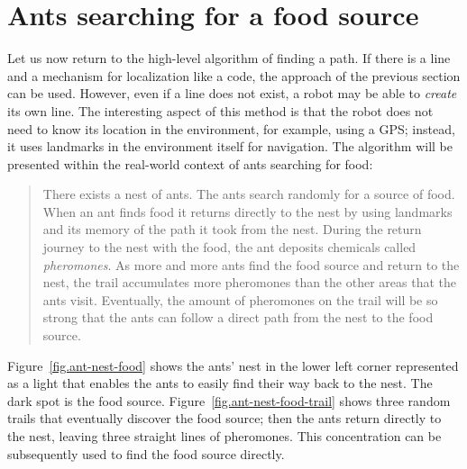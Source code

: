 \section{Ants searching for a food source}\label{s.ants}

Let us now return to the high-level algorithm of finding a path. If there is a line and a mechanism for localization like a code, the approach of the previous section can be used. However, even if a line does not exist, a robot may be able to \emph{create} its own line. The interesting aspect of this method is that the robot does not need to know its location in the environment, for example, using a GPS; instead, it uses landmarks in the environment itself for navigation. The algorithm will be presented within the real-world context of ants searching for food:

\begin{quote}
\normalsize There exists a nest of ants. The ants search randomly for a source of food. When an ant finds food it returns directly to the nest by using landmarks and its memory of the path it took from the nest. During the return journey to the nest with the food, the ant deposits chemicals called \emph{pheromones}. As more and more ants find the food source and return to the nest, the trail accumulates more pheromones than the other areas that the ants visit. Eventually, the amount of pheromones on the trail will be so strong that the ants can follow a direct path from the nest to the food source.
\end{quote}

Figure~\ref{fig.ant-nest-food} shows the ants' nest in the lower left corner represented as a light that enables the ants to easily find their way back to the nest. The dark spot is the food source. Figure~\ref{fig.ant-nest-food-trail} shows three random trails that eventually discover the food source; then the ants return directly to the nest, leaving three straight lines of pheromones. This concentration can be subsequently used to find the food source directly.

